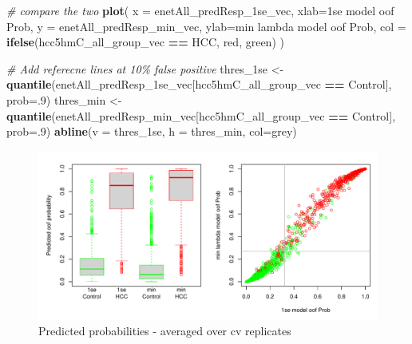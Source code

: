 \documentclass[
]{book}
\newenvironment{Shaded}{\begin{snugshade}}{\end{snugshade}}
\newcommand{\CommentTok}[1]{\textcolor[rgb]{0.56,0.35,0.01}{\textit{#1}}}
\newcommand{\DataTypeTok}[1]{\textcolor[rgb]{0.13,0.29,0.53}{#1}}
\newcommand{\DecValTok}[1]{\textcolor[rgb]{0.00,0.00,0.81}{#1}}
\newcommand{\KeywordTok}[1]{\textcolor[rgb]{0.13,0.29,0.53}{\textbf{#1}}}
\newcommand{\NormalTok}[1]{#1}
\newcommand{\OperatorTok}[1]{\textcolor[rgb]{0.81,0.36,0.00}{\textbf{#1}}}
\newcommand{\StringTok}[1]{\textcolor[rgb]{0.31,0.60,0.02}{#1}}
\begin{document}
\begin{Shaded}
\begin{Highlighting}[]
\CommentTok{\# compare the two}
\KeywordTok{plot}\NormalTok{(}
 \DataTypeTok{x =}\NormalTok{ enetAll\_predResp\_1se\_vec, }\DataTypeTok{xlab=}\StringTok{\textquotesingle{}1se model oof Prob\textquotesingle{}}\NormalTok{,}
 \DataTypeTok{y =}\NormalTok{ enetAll\_predResp\_min\_vec, }\DataTypeTok{ylab=}\StringTok{\textquotesingle{}min lambda model oof Prob\textquotesingle{}}\NormalTok{,}
 \DataTypeTok{col =} \KeywordTok{ifelse}\NormalTok{(hcc5hmC\_all\_group\_vec }\OperatorTok{==}\StringTok{ \textquotesingle{}HCC\textquotesingle{}}\NormalTok{, }\StringTok{\textquotesingle{}red\textquotesingle{}}\NormalTok{, }\StringTok{\textquotesingle{}green\textquotesingle{}}\NormalTok{)}
\NormalTok{)}
 
\CommentTok{\# Add referecne lines at 10\% false positive}
\NormalTok{thres\_1se <{-}}\StringTok{ }\KeywordTok{quantile}\NormalTok{(enetAll\_predResp\_1se\_vec[hcc5hmC\_all\_group\_vec }\OperatorTok{==}\StringTok{ \textquotesingle{}Control\textquotesingle{}}\NormalTok{], }\DataTypeTok{prob=}\NormalTok{.}\DecValTok{9}\NormalTok{)}
\NormalTok{thres\_min <{-}}\StringTok{ }\KeywordTok{quantile}\NormalTok{(enetAll\_predResp\_min\_vec[hcc5hmC\_all\_group\_vec }\OperatorTok{==}\StringTok{ \textquotesingle{}Control\textquotesingle{}}\NormalTok{], }\DataTypeTok{prob=}\NormalTok{.}\DecValTok{9}\NormalTok{)}
\KeywordTok{abline}\NormalTok{(}\DataTypeTok{v =}\NormalTok{ thres\_1se, }\DataTypeTok{h =}\NormalTok{ thres\_min, }\DataTypeTok{col=}\StringTok{\textquotesingle{}grey\textquotesingle{}}\NormalTok{)}
\end{Highlighting}
\end{Shaded}

\begin{figure}
\centering
\includegraphics{Static/figures/hcc5hmC-glmnetSuiteB-enet-get-sample-pred-1.pdf}
\caption{\label{fig:hcc5hmC-glmnetSuiteB-enet-get-sample-pred}Predicted probabilities - averaged over cv replicates}
\end{figure}
\end{document}
